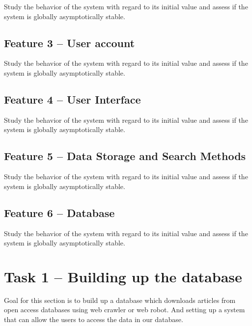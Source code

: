 \documentclass[a4paper]{article} %
\begin{document}
Study the behavior of the system with regard to its initial value and assess if the system is globally asymptotically stable.
 
\subsection*{Feature 3 -- User account}
\label{task1:feature3}

Study the behavior of the system with regard to its initial value and assess if the system is globally asymptotically stable.

\subsection*{Feature 4 -- User Interface}
\label{task1:feature4}

Study the behavior of the system with regard to its initial value and assess if the system is globally asymptotically stable.

\subsection*{Feature 5 -- Data Storage and Search Methods}
\label{task1:feature5}

Study the behavior of the system with regard to its initial value and assess if the system is globally asymptotically stable.

\subsection*{Feature 6 -- Database}
\label{task1:feature6}

Study the behavior of the system with regard to its initial value and assess if the system is globally asymptotically stable.



\section*{Task 1 -- Building up the database}
\label{task1}

Goal for this section is to build up a database which downloads articles from open access databases using web crawler or web robot. And setting up a system that can allow the users to access the data in our database.
\end{document}
